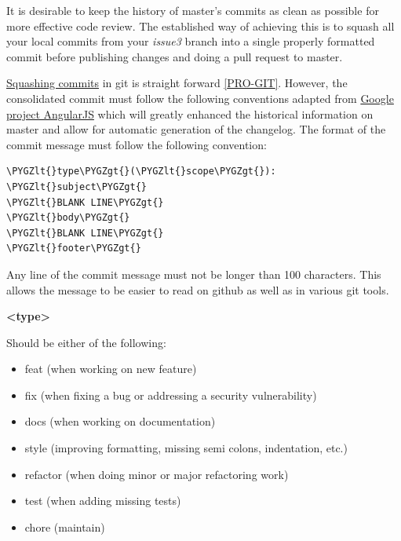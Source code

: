 \documentclass[letterpaper,10pt,english]{sphinxmanual}
\def\PYGZlt{\char`\<}
\def\PYGZgt{\char`\>}
\begin{document}
It is desirable to keep the history of master's commits as clean as
possible for more effective code review. The established way of
achieving this is to squash all your local commits from your \emph{issue3}
branch into a single properly formatted commit before publishing
changes and doing a pull request to master.

\href{http://www.git-scm.com/book/en/Git-Tools-Rewriting-History\#Squashing-Commits}{Squashing commits}
in git is straight forward {\hyperref[developer-guide:pro-git]{{[}PRO-GIT{]}}}. However, the consolidated
commit must follow the following conventions adapted from \href{https://docs.google.com/document/d/1QrDFcIiPjSLDn3EL15IJygNPiHORgU1\_OOAqWjiDU5Y/edit\#}{Google
project AngularJS}
which will greatly enhanced the historical information on master and
allow for automatic generation of the changelog. The format of the
commit message must follow the following convention:

\begin{Verbatim}[commandchars=\\\{\}]
\PYGZlt{}type\PYGZgt{}(\PYGZlt{}scope\PYGZgt{}): \PYGZlt{}subject\PYGZgt{}
\PYGZlt{}BLANK LINE\PYGZgt{}
\PYGZlt{}body\PYGZgt{}
\PYGZlt{}BLANK LINE\PYGZgt{}
\PYGZlt{}footer\PYGZgt{}
\end{Verbatim}

Any line of the commit message must not be longer than 100
characters. This allows the message to be easier to read on github as
well as in various git tools.

\textbf{\textless{}type\textgreater{}}

Should be either of the following:
\begin{itemize}
\item {} 
feat (when working on new feature)

\item {} 
fix (when fixing a bug or addressing a security vulnerability)

\item {} 
docs (when working on documentation)

\item {} 
style (improving formatting, missing semi colons, indentation, etc.)

\item {} 
refactor (when doing minor or major refactoring work)

\item {} 
test (when adding missing tests)

\item {} 
chore (maintain)

\end{itemize}
\end{document}
